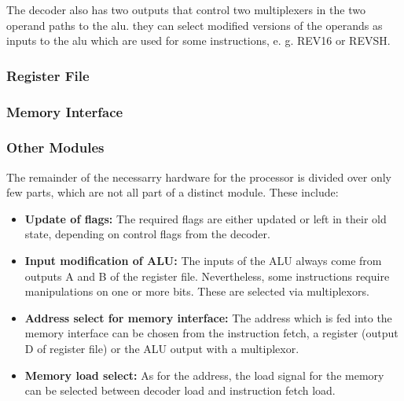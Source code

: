 The decoder also has two outputs that control two multiplexers in the two operand paths to the alu. they can select modified versions of the operands as inputs to the alu which are used for some instructions, e. g. REV16 or REVSH.

\subsubsection{Register File}
\label{subsubsec:regfisterfile}

\subsubsection{Memory Interface}
\label{subsubsec:memoryinterface}

\subsubsection{Other Modules}
\label{subsubsec:othermodules}

The remainder of the necessarry hardware for the processor is divided over only few parts, which are not all part of a distinct module. These include:
\begin{itemize}
\item \textbf{Update of flags: }The required flags are either updated or left in their old state, depending on control flags from the decoder.
\item \textbf{Input modification of ALU:} The inputs of the ALU always come from outputs A and B of the register file. Nevertheless, some instructions require manipulations on one or more bits. These are selected via multiplexors.
\item \textbf{Address select for memory interface:} The address which is fed into the memory interface can be chosen from the instruction fetch, a register (output D of register file) or the ALU output with a multiplexor.
\item \textbf{Memory load select:} As for the address, the load signal for the memory can be selected between decoder load and instruction fetch load.
\end{itemize}


